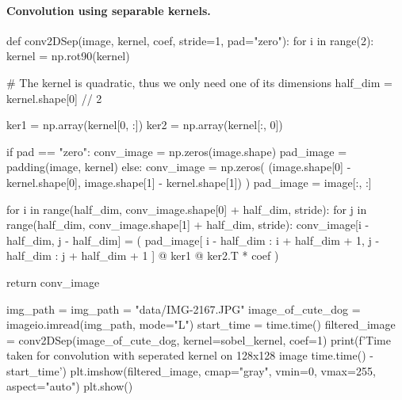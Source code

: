 \documentclass[%
oneside,                 %
final,                   %
10pt]{article}
\begin{document}
\paragraph{Convolution using separable kernels.}








































\bpycod
def conv2DSep(image, kernel, coef, stride=1, pad="zero"):
    for i in range(2):
        kernel = np.rot90(kernel)

    # The kernel is quadratic, thus we only need one of its dimensions
    half_dim = kernel.shape[0] // 2

    ker1 = np.array(kernel[0, :])
    ker2 = np.array(kernel[:, 0])

    if pad == "zero":
        conv_image = np.zeros(image.shape)
        pad_image = padding(image, kernel)
    else:
        conv_image = np.zeros(
            (image.shape[0] - kernel.shape[0], image.shape[1] - kernel.shape[1])
        )
        pad_image = image[:, :]

    for i in range(half_dim, conv_image.shape[0] + half_dim, stride):
        for j in range(half_dim, conv_image.shape[1] + half_dim, stride):
            conv_image[i - half_dim, j - half_dim] = (
                pad_image[
                    i - half_dim : i + half_dim + 1, j - half_dim : j + half_dim + 1
                ]
                @ ker1
                @ ker2.T
                * coef
            )

    return conv_image

img_path = img_path = "data/IMG-2167.JPG"
image_of_cute_dog = imageio.imread(img_path, mode="L")
start_time = time.time()
filtered_image = conv2DSep(image_of_cute_dog, kernel=sobel_kernel, coef=1)
print(f'Time taken for convolution with seperated kernel on 128x128 image {time.time() - start_time}')
plt.imshow(filtered_image, cmap="gray", vmin=0, vmax=255, aspect="auto")
plt.show()
\end{document}
